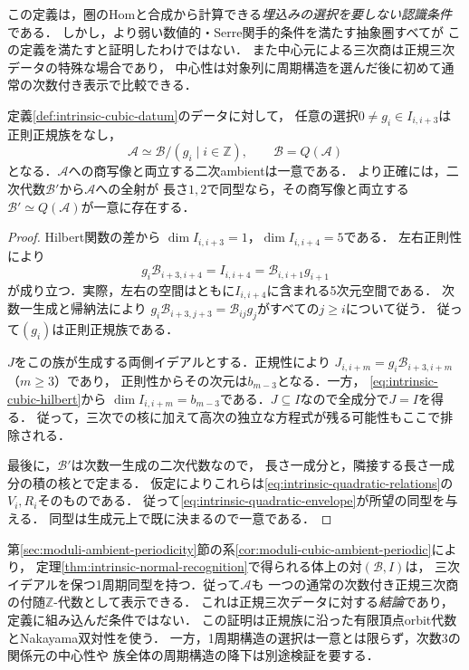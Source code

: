 この定義は，圏のHomと合成から計算できる\emph{埋込みの選択を要しない認識条件}である．
しかし，より弱い数値的・Serre関手的条件を満たす抽象圏すべてが
この定義を満たすと証明したわけではない．
また中心元による三次商は正規三次データの特殊な場合であり，
中心性は対象列に周期構造を選んだ後に初めて通常の次数付き表示で比較できる．

\begin{theorem}[内在的な正規超曲面認識]
\label{thm:intrinsic-normal-recognition}
定義\ref{def:intrinsic-cubic-datum}のデータに対して，
任意の選択$0\ne g_i\in I_{i,i+3}$は正則正規族をなし，
\begin{equation}\label{eq:intrinsic-normal-presentation}
 \mathcal A\simeq\mathcal B/(g_i\mid i\in\mathbb Z),
 \qquad \mathcal B=Q(\mathcal A)
\end{equation}
となる．$\mathcal A$への商写像と両立する二次ambientは一意である．
より正確には，二次代数$\mathcal B'$から$\mathcal A$への全射が
長さ$1,2$で同型なら，その商写像と両立する
$\mathcal B'\simeq Q(\mathcal A)$が一意に存在する．
\end{theorem}
\begin{proof}
Hilbert関数の差から
$\dim I_{i,i+3}=1$，$\dim I_{i,i+4}=5$である．
左右正則性により
\begin{equation}\label{eq:intrinsic-degree-four-normal}
 g_i\mathcal B_{i+3,i+4}
   =I_{i,i+4}
   =\mathcal B_{i,i+1}g_{i+1}
\end{equation}
が成り立つ．実際，左右の空間はともに$I_{i,i+4}$に含まれる5次元空間である．
次数一生成と帰納法により
$g_i\mathcal B_{i+3,j+3}=\mathcal B_{ij}g_j$がすべての$j\geq i$について従う．
従って$(g_i)$は正則正規族である．

$J$をこの族が生成する両側イデアルとする．正規性により
$J_{i,i+m}=g_i\mathcal B_{i+3,i+m}$（$m\geq3$）であり，
正則性からその次元は$b_{m-3}$となる．一方，
\eqref{eq:intrinsic-cubic-hilbert}から
$\dim I_{i,i+m}=b_{m-3}$である．$J\subseteq I$なので全成分で$J=I$を得る．
従って，三次での核に加えて高次の独立な方程式が残る可能性もここで排除される．

最後に，$\mathcal B'$は次数一生成の二次代数なので，
長さ一成分と，隣接する長さ一成分の積の核とで定まる．
仮定によりこれらは\eqref{eq:intrinsic-quadratic-relations}の$V_i,R_i$そのものである．
従って\eqref{eq:intrinsic-quadratic-envelope}が所望の同型を与える．
同型は生成元上で既に決まるので一意である．
\end{proof}

\begin{remark}[周期性との関係]
\label{rem:intrinsic-periodicity-scope}
第\ref{sec:moduli-ambient-periodicity}節の系\ref{cor:moduli-cubic-ambient-periodic}により，
定理\ref{thm:intrinsic-normal-recognition}で得られる体上の対$(\mathcal B,I)$は，
三次イデアルを保つ1周期同型を持つ．従って$\mathcal A$も
一つの通常の次数付き正規三次商の付随$\mathbb Z$-代数として表示できる．
これは正規三次データに対する\emph{結論}であり，定義に組み込んだ条件ではない．
この証明は正規族に沿った有限頂点orbit代数とNakayama双対性を使う．
一方，1周期構造の選択は一意とは限らず，次数3の関係元の中心性や
族全体の周期構造の降下は別途検証を要する．
\end{remark}

